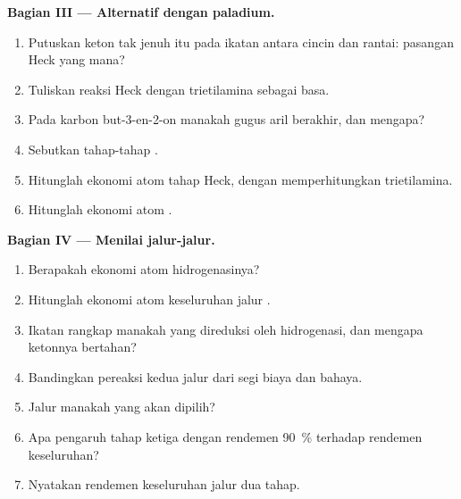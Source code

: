 \begin{problem}
\medskip
\noindent\textbf{Bagian III --- Alternatif dengan paladium.}
\begin{enumerate}[resume]
  \item Putuskan keton tak jenuh itu pada ikatan antara cincin dan rantai:
        pasangan Heck yang mana?
  \item Tuliskan reaksi Heck dengan trietilamina sebagai basa.
  \item Pada karbon but-3-en-2-on manakah gugus aril berakhir, dan mengapa?
  \item Sebutkan tahap-tahap .
  \item Hitunglah ekonomi atom tahap Heck, dengan memperhitungkan trietilamina.
  \item Hitunglah ekonomi atom .
\end{enumerate}

\medskip
\noindent\textbf{Bagian IV --- Menilai jalur-jalur.}
\begin{enumerate}[resume]
  \item Berapakah ekonomi atom hidrogenasinya?
  \item Hitunglah ekonomi atom keseluruhan jalur .
  \item Ikatan rangkap manakah yang direduksi oleh hidrogenasi, dan mengapa ketonnya bertahan?
  \item Bandingkan pereaksi kedua jalur dari segi biaya dan bahaya.
  \item Jalur manakah yang akan dipilih?
  \item Apa pengaruh tahap ketiga dengan rendemen 90~\% terhadap rendemen keseluruhan?
  \item Nyatakan rendemen keseluruhan jalur  dua tahap.
\end{enumerate}
\end{problem}
